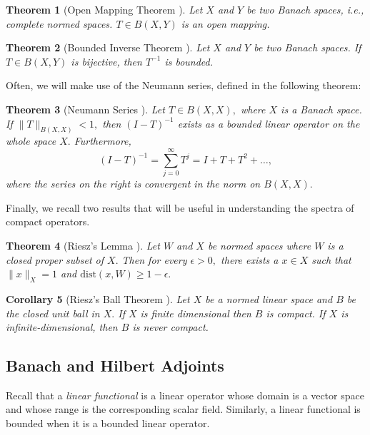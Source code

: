 \documentclass[12pt,a4paper]{article}
\theoremstyle{boldthm}
\newtheorem{theorem}{Theorem}[section]
\newtheorem{corollary}[theorem]{Corollary}
\theoremstyle{bolddefn}
\begin{document}
\begin{theorem}[{Open Mapping Theorem \cite[4.12-2]{krey}}] 
    Let $X$ and $Y$ be two Banach spaces, i.e., complete normed spaces. $T \in B(X, Y)$ is an open mapping.
\end{theorem}

\begin{theorem}[{Bounded Inverse Theorem \cite[4.12-2]{krey}}]  \label{BIT}
     Let $X$ and $Y$ be two Banach spaces. If $T \in B(X, Y)$ is bijective, then $T^{-1}$ is bounded. 
\end{theorem}


Often, we will make use of the Neumann series, defined in the following theorem:

\begin{theorem}[{Neumann Series \cite[7.3-1]{krey}}]  \label{neum}
    Let $T \in B(X, X),$ where $X$ is a Banach space. If $\|T\|_{B(X, X)} < 1,$ then $(I - T)^{-1}$ exists as a bounded linear operator on the whole space $X.$ Furthermore, 
    \begin{equation}
        (I - T)^{-1} = \sum_{j=0}^{\infty} T^j = I + T + T^2 + \dots,
    \end{equation}
    where the series on the right is convergent in the norm on $B(X, X).$
\end{theorem}


Finally, we recall two results that will be useful in understanding the spectra of compact operators. 
\begin{theorem}[Riesz's Lemma \cite{umberto}] \label{RL}
    Let $W$ and $X$ be normed spaces where $W$ is a closed proper subset of $X.$ Then for every $\epsilon > 0,$ there exists a $x \in X$ such that $\|x\|_X = 1$ and $\text{dist}(x, W) \ge 1-\epsilon.$
\end{theorem}

\begin{corollary}[{Riesz's Ball Theorem \cite[2.5-5]{krey}}] \label{ball}
    Let $X$ be a normed linear space and $B$ be the closed unit ball in $X.$ If $X$ is finite dimensional then $B$ is compact. If $X$ is infinite-dimensional, then $B$ is never compact.
\end{corollary}


\subsection{Banach and Hilbert Adjoints}

Recall that a \textit{linear functional} is a linear operator whose domain is a vector space and whose range is the corresponding scalar field. Similarly, a linear functional is bounded when it is a bounded linear operator. 
\end{document}
